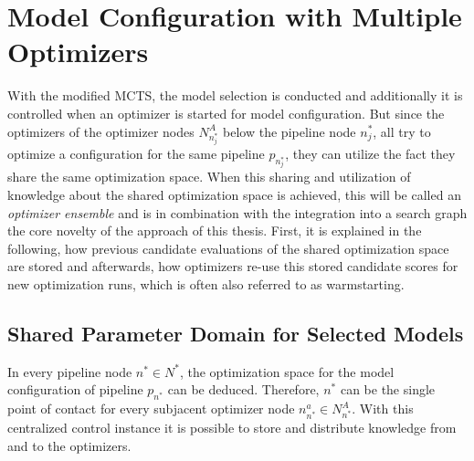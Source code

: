 \section{Model Configuration with Multiple Optimizers}
\label{sec:approach:configuration}
With the modified MCTS, the model selection is conducted and additionally it is controlled when an optimizer is started for model configuration.
But since the optimizers of the optimizer nodes $N^A_{n^*_j}$ below the pipeline node $n^*_j$, all try to optimize a configuration for the same pipeline $p_{n^*_j}$, they can utilize the fact they share the same optimization space.
When this sharing and utilization of knowledge about the shared optimization space is achieved, this will be called an \textit{optimizer ensemble} and is in combination with the integration into a search graph the core novelty of the approach of this thesis.\newline
First, it is explained in the following, how previous candidate evaluations of the shared optimization space are stored and afterwards, how optimizers re-use this stored candidate scores for new optimization runs, which is often also referred to as warmstarting.

\subsection{Shared Parameter Domain for Selected Models}
\label{sec:approach:configuration:parameter}
In every pipeline node $n^* \in N^*$, the optimization space for the model configuration of pipeline $p_{n^*}$ can be deduced.
Therefore, $n^*$ can be the single point of contact for every subjacent optimizer node $n^{a}_{n^*} \in N^A_{n^*}$.
With this centralized control instance it is possible to store and distribute knowledge from and to the optimizers.

